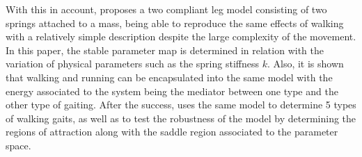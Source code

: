 With this in account, \cite{Seyfarth2006} proposes a two compliant leg model consisting of two springs attached to a mass, being able to reproduce the same effects of walking with a relatively simple description despite the large complexity of the movement. In this paper, the stable parameter map is determined in relation with the variation of physical parameters such as the spring stiffness $k$. Also, it is shown that walking and running can be encapsulated into the same model with the energy associated to the system being the mediator between one type and the other type of gaiting.  After the success, \cite{Rummel2010} uses the same model to determine 5 types of walking gaits, as well as to test the robustness of the model by determining the regions of attraction along with the saddle region associated to the parameter space.






